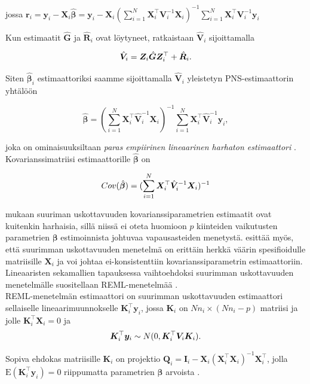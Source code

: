 \documentclass[finnish]{docopts}
\begin{document}
jossa $\bm{r}_i = \bm{y}_i - \bm{X}_i \hat{\bm{\beta}} = \bm{y}_i - \bm{X}_i (\sum\limits_{i=1}^{N} \bm{X}_{i}^\top \bm{V}_i^{-1} \bm{X}_{i})^{-1} \sum\limits_{i=1}^{N} \bm{X}_{i}^\top \bm{V}_i^{-1} \bm{y}_i$

Kun estimaatit $\hat{\bm{G}}$ ja $\hat{\bm{R}}_i$ ovat löytyneet, ratkaistaan $\hat{\bm{V}}_i$ sijoittamalla

$$
\hat{\bm{V}}_i = \bm{Z}_i \hat{\bm{G}} \bm{Z}^\top_i + \hat{\bm{R}}_i \\.
$$

Siten $\hat{\bm{\beta}}_i$ estimaattoriksi saamme sijoittamalla $\hat{\bm{V}}_i$ yleistetyn PNS-estimaattorin yhtälöön

$$
\hat{\bm{\beta}} =  (\sum\limits_{i=1}^{N} \bm{X}_{i}^\top \hat{\bm{V}}_i^{-1} \bm{X}_{i})^{-1} \sum\limits_{i=1}^{N} \bm{X}_{i}^\top \hat{\bm{V}}_i^{-1} \bm{y}_i,
$$

joka on ominaisuuksiltaan \textit{paras empiirinen lineaarinen harhaton estimaattori} \cite{west14}. \\

Kovarianssimatriisi estimaattorille $\hat{\bm{\beta}}$ on

$$
Cov(\hat{\bm{\beta}}) = (\sum\limits_{i=1}^{N} \bm{X}_{i}^\top \hat{\bm{V}}_i^{-1} \bm{X}_{i})^{-1} \\
$$

\cite{west14} mukaan suuriman uskottavuuden kovarianssiparametrien estimaatit ovat kuitenkin harhaisia, sillä niissä ei oteta huomioon $p$ kiinteiden vaikutusten parametrien $\bm{\beta}$ estimoinnista johtuvaa vapausasteiden menetystä. \cite{diggle13} esittää myös, että suurimman uskottavuuden menetelmä on erittäin herkkä väärin spesifioidulle matriisille $\bm{X}_{i}$ ja voi johtaa ei-konsistenttiin kovarianssiparametrin estimaattoriin.\\

Lineaaristen sekamallien tapauksessa vaihtoehdoksi suurimman uskottavuuden menetelmälle suositellaan REML-menetelmää \cite{diggle13, pinheiro00, verbeke00}.\\

REML-menetelmän estimaattori on suurimman uskottavuuden estimaattori sellaiselle lineaarimuunnokselle $\bm{K}_{i}^\top \bm{y}_i$, jossa $\bm{K}_i$ on $Nn_{i} \times (N    n_{i} - p)$ matriisi ja jolle $\bm{K}_{i}^\top \bm{X}_i = 0$ ja 
$$
\bm{K}_{i}^\top \bm{y}_i \sim N(0, \bm{K}_{i}^\top \bm{V}_i \bm{K}_{i}).\\
$$


Sopiva ehdokas matriisille $\bm{K}_{i}$ on projektio $\bm{Q}_i = \bm{I}_i - \bm{X}_i(\bm{X}_i^\top \bm{X}_i)^{-1} \bm{X}_i^\top$, jolla $\text{E}(\bm{K}_{i}^\top \bm{y}_i) = 0$ riippumatta parametrien $\bm{\beta}$ arvoista \cite{diggle13}. \\
\end{document}
